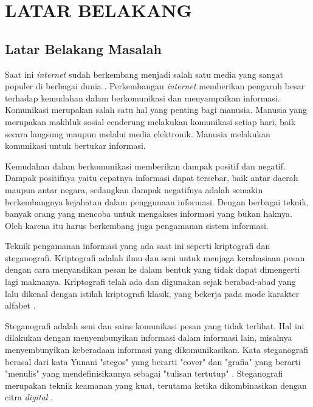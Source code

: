 
\chapter{LATAR BELAKANG}

\section{Latar Belakang Masalah}
Saat ini \emph{internet} sudah berkembang menjadi salah satu media yang sangat populer di berbagai dunia \cite{bunyamin}. Perkembangan \emph{internet} memberikan pengaruh besar terhadap kemudahan dalam berkomunikasi dan menyampaikan informasi. Komunikasi merupakan salah satu hal yang penting bagi manusia. Manusia yang merupakan makhluk sosial cenderung melakukan komunikasi setiap hari, baik secara langsung maupun melalui media elektronik. Manusia melakukan komunikasi untuk bertukar informasi.

Kemudahan dalam berkomunikasi memberikan dampak positif dan negatif. Dampak positifnya yaitu cepatnya informasi dapat tersebar, baik antar daerah maupun antar negara, sedangkan dampak negatifnya adalah semakin berkembangnya kejahatan dalam penggunaan informasi. Dengan berbagai teknik, banyak orang yang mencoba untuk mengakses informasi yang bukan haknya. Oleh karena itu harus berkembang juga pengamanan sistem informasi.

Teknik pengamanan informasi yang ada saat ini seperti kriptografi dan steganografi. Kriptografi adalah ilmu dan seni untuk menjaga kerahasiaan pesan dengan cara menyandikan pesan  ke dalam bentuk yang tidak dapat dimengerti lagi maknanya. Kriptografi telah ada dan digunakan sejak berabad-abad yang lalu dikenal dengan istilah kriptografi klasik, yang bekerja pada mode karakter alfabet  \cite{rakhmat}.

Steganografi adalah seni dan sains komunikasi pesan yang tidak terlihat. Hal ini dilakukan dengan menyembunyikan informasi dalam informasi lain, misalnya menyembunyikan keberadaan informasi yang dikomunikasikan. Kata steganografi berasal dari kata Yunani "stegos" yang berarti "cover" dan "grafia" yang berarti "menulis" yang mendefinisikannya sebagai "tulisan tertutup" \cite{kadam}. Steganografi merupakan teknik keamanan yang kuat, terutama ketika dikombinasikan dengan citra \emph{digital} \cite{gautam}.

